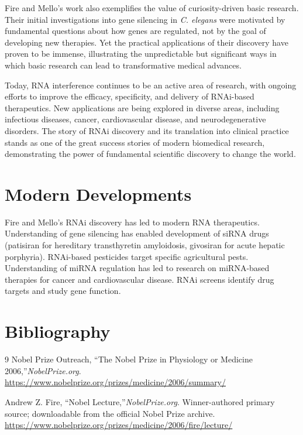 Fire and Mello's work also exemplifies the value of curiosity-driven basic research. Their initial investigations into gene silencing in \textit{C. elegans} were motivated by fundamental questions about how genes are regulated, not by the goal of developing new therapies. Yet the practical applications of their discovery have proven to be immense, illustrating the unpredictable but significant ways in which basic research can lead to transformative medical advances.

Today, RNA interference continues to be an active area of research, with ongoing efforts to improve the efficacy, specificity, and delivery of RNAi-based therapeutics. New applications are being explored in diverse areas, including infectious diseases, cancer, cardiovascular disease, and neurodegenerative disorders. The story of RNAi discovery and its translation into clinical practice stands as one of the great success stories of modern biomedical research, demonstrating the power of fundamental scientific discovery to change the world.


\section{Modern Developments}

Fire and Mello's RNAi discovery has led to modern RNA therapeutics. Understanding of gene silencing has enabled development of siRNA drugs (patisiran for hereditary transthyretin amyloidosis, givosiran for acute hepatic porphyria). RNAi-based pesticides target specific agricultural pests. Understanding of miRNA regulation has led to research on miRNA-based therapies for cancer and cardiovascular disease. RNAi screens identify drug targets and study gene function.


\section{Bibliography}

\begin{thebibliography}{9}
Nobel Prize Outreach, ``The Nobel Prize in Physiology or Medicine 2006,''\emph{NobelPrize.org}.\\
\url{https://www.nobelprize.org/prizes/medicine/2006/summary/}

Andrew Z. Fire, ``Nobel Lecture,''\emph{NobelPrize.org}. Winner-authored primary source; downloadable from the official Nobel Prize archive.\\
\url{https://www.nobelprize.org/prizes/medicine/2006/fire/lecture/}
\end{thebibliography}
